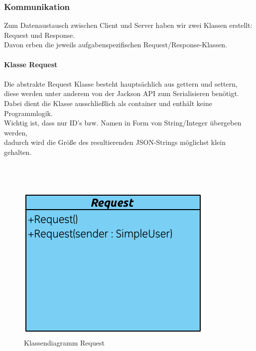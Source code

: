 \subsubsection{Kommunikation}
Zum Datenaustausch zwischen Client und Server haben wir zwei Klassen erstellt:\\
Request und Response.\\
Davon erben die jeweils aufgabenspezifischen Request/Response-Klassen.\\
\\
\textbf{Klasse Request}\\
\\
Die abstrakte Request Klasse besteht hauptsächlich aus gettern und settern,\\
diese werden unter anderem von der Jackson API zum Serialisieren benötigt.\\
Dabei dient die Klasse ausschließlich als container und enthält keine Programmlogik.\\
Wichtig ist, dass nur ID's bzw. Namen in Form von String/Integer übergeben werden,\\
dadurch wird die Größe des resultierenden JSON-Strings möglichst klein gehalten.\\
\\ \\ \\

\begin{figure}[h]
     \centering
     \includegraphics[scale=1.0,trim=2 2 2 2,clip=true]{servergraphs/request.pdf}
     \caption{Klassendiagramm Request}
\end{figure}
\clearpage

